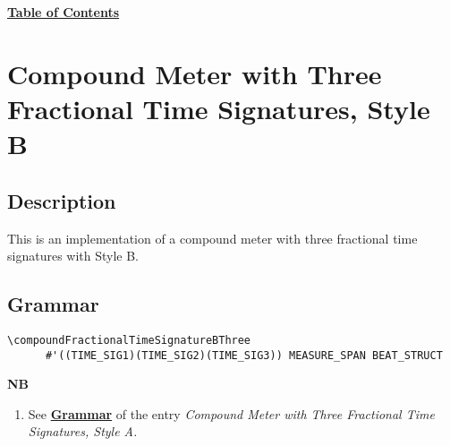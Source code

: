 \hyperref[sec:toc]{\textbf{Table of Contents}}

\vfill \break






\section {Compound Meter with Three Fractional Time Signatures, Style B}

\hfill
{}
\hfill

\subsection{Description}
This is an implementation of a compound meter with three fractional time signatures with Style B.  

\subsection{Grammar}
\begin{verbatim}
\compoundFractionalTimeSignatureBThree 
      #'((TIME_SIG1)(TIME_SIG2)(TIME_SIG3)) MEASURE_SPAN BEAT_STRUCT
\end{verbatim}
\textbf{NB}
\begin{enumerate}
\item See \hyperref[sec:compoundfractionalmeter_grammar]{\textbf{Grammar}} of the entry \textit{Compound Meter with Three Fractional Time Signatures, Style A.}
\end{enumerate}

